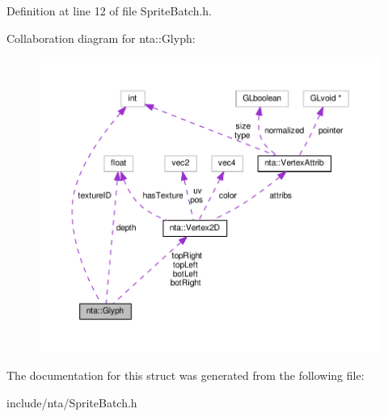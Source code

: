 Definition at line 12 of file Sprite\+Batch.\+h.



Collaboration diagram for nta\+:\+:Glyph\+:
\nopagebreak
\begin{figure}[H]
\begin{center}
\leavevmode
\includegraphics[width=350pt]{d8/d54/structnta_1_1Glyph__coll__graph}
\end{center}
\end{figure}


The documentation for this struct was generated from the following file\+:\begin{DoxyCompactItemize}
\item 
include/nta/Sprite\+Batch.\+h\end{DoxyCompactItemize}
